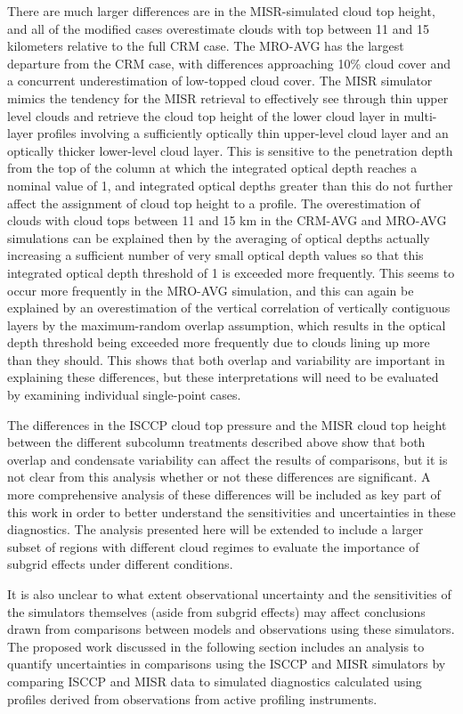 \documentclass[letter]{article}
\begin{document}
There are much larger differences are in the MISR-simulated cloud top height, and all of the modified cases overestimate clouds with top between 11 and 15 kilometers relative to the full CRM case. The MRO-AVG has the largest departure from the CRM case, with differences approaching 10\% cloud cover and a concurrent underestimation of low-topped cloud cover. The MISR simulator mimics the tendency for the MISR retrieval to effectively see through thin upper level clouds and retrieve the cloud top height of the lower cloud layer in multi-layer profiles involving a sufficiently optically thin upper-level cloud layer and an optically thicker lower-level cloud layer. This is sensitive to the penetration depth from the top of the column at which the integrated optical depth reaches a nominal value of 1, and integrated optical depths greater than this do not further affect the assignment of cloud top height to a profile. The overestimation of clouds with cloud tops between 11 and 15 km in the CRM-AVG and MRO-AVG simulations can be explained then by the averaging of optical depths actually increasing a sufficient number of very small optical depth values so that this integrated optical depth threshold of 1 is exceeded more frequently. This seems to occur more frequently in the MRO-AVG simulation, and this can again be explained by an overestimation of the vertical correlation of vertically contiguous layers by the maximum-random overlap assumption, which results in the optical depth threshold being exceeded more frequently due to clouds lining up more than they should. This shows that both overlap and variability are important in explaining these differences, but these interpretations will need to be evaluated by examining individual single-point cases.

The differences in the ISCCP cloud top pressure and the MISR cloud top height between the different subcolumn treatments described above show that both overlap and condensate variability can affect the results of comparisons, but it is not clear from this analysis whether or not these differences are significant. A more comprehensive analysis of these differences will be included as key part of this work in order to better understand the sensitivities and uncertainties in these diagnostics. The analysis presented here will be extended to include a larger subset of regions with different cloud regimes to evaluate the importance of subgrid effects under different conditions.

It is also unclear to what extent observational uncertainty and the sensitivities of the simulators themselves (aside from subgrid effects) may affect conclusions drawn from comparisons between models and observations using these simulators. The proposed work discussed in the following section includes an analysis to quantify uncertainties in comparisons using the ISCCP and MISR simulators by comparing ISCCP and MISR data to simulated diagnostics calculated using profiles derived from observations from active profiling instruments.
\end{document}
